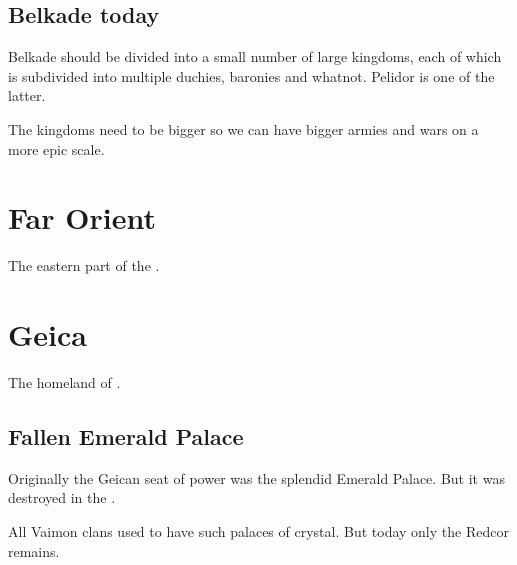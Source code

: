 \subsection{Belkade today}
Belkade should be divided into a small number of large kingdoms, each of which is subdivided into multiple duchies, baronies and whatnot. Pelidor is one of the latter. 

The kingdoms need to be bigger so we can have bigger armies and wars on a more epic scale. 















\section{Far Orient}
\label{Far Orient}
The eastern part of the . 















\section{Geica}
\label{Geica}
The homeland of .





\subsection{Fallen Emerald Palace}
Originally the Geican seat of power was the splendid Emerald Palace. 
But it was destroyed in the \darkfall. 

All Vaimon clans used to have such palaces of crystal. 
But today only the Redcor  remains. 















